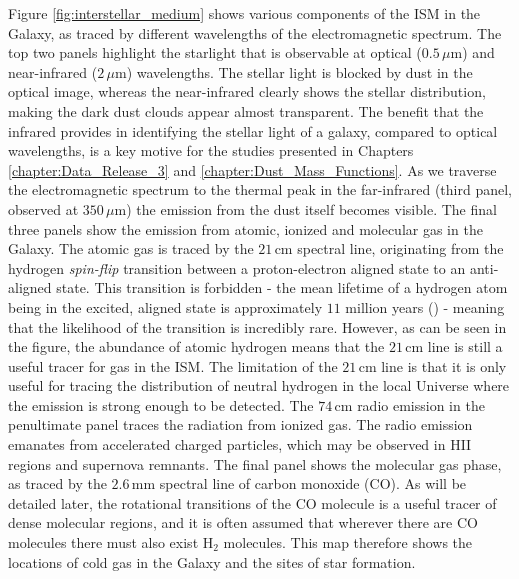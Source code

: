 Figure \ref{fig:interstellar_medium} shows various components of the ISM in the Galaxy, as traced by different wavelengths of the electromagnetic spectrum. The top two panels highlight the starlight that is observable at optical ($0.5\,\mu$m) and near-infrared ($2\,\mu$m) wavelengths. The stellar light is blocked by dust in the optical image, whereas the near-infrared clearly shows the stellar distribution, making the dark dust clouds appear almost transparent. The benefit that the infrared provides in identifying the stellar light of a galaxy, compared to optical wavelengths, is a key motive for the studies presented in Chapters \ref{chapter:Data_Release_3} and \ref{chapter:Dust_Mass_Functions}. As we traverse the electromagnetic spectrum to the thermal peak in the far-infrared (third panel, observed at $350\,\mu$m) the emission from the dust itself becomes visible. The final three panels show the emission from atomic, ionized and molecular gas in the Galaxy. The atomic gas is traced by the $21\,$cm spectral line, originating from the hydrogen \textit{spin-flip} transition between a proton-electron aligned state to an anti-aligned state. This transition is forbidden - the mean lifetime of a hydrogen atom being in the excited, aligned state is approximately $11$ million years (\citealt{Mhaske_2022}) - meaning that the likelihood of the transition is incredibly rare. However, as can be seen in the figure, the abundance of atomic hydrogen means that the $21\,$cm line is still a useful tracer for gas in the ISM. The limitation of the $21\,$cm line is that it is only useful for tracing the distribution of neutral hydrogen in the local Universe where the emission is strong enough to be detected. The $74\,$cm radio emission in the penultimate panel traces the radiation from ionized gas. The radio emission emanates from accelerated charged particles, which may be observed in HII regions and supernova remnants. The final panel shows the molecular gas phase, as traced by the $2.6\,$mm spectral line of carbon monoxide (CO). As will be detailed later, the rotational transitions of the CO molecule is a useful tracer of dense molecular regions, and it is often assumed that wherever there are CO molecules there must also exist H$_2$ molecules. This map therefore shows the locations of cold gas in the Galaxy and the sites of star formation.

